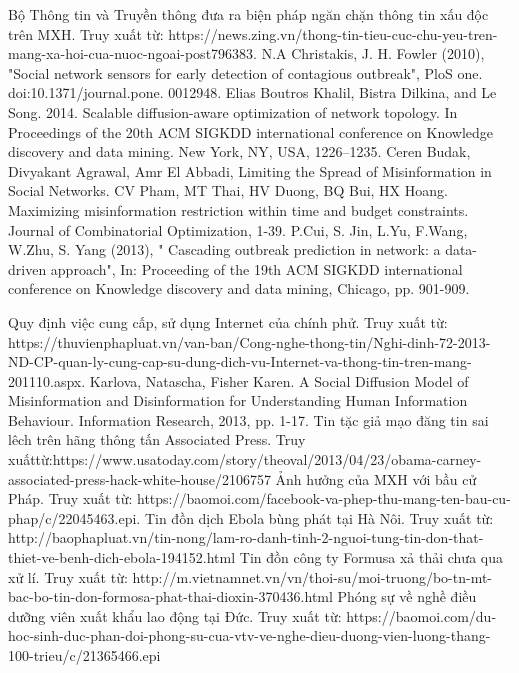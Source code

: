 
\begin{thebibliography}{4}
	 Bộ Thông tin và Truyền thông đưa ra biện pháp ngăn chặn thông tin xấu độc trên MXH. Truy xuất từ: https://news.zing.vn/thong-tin-tieu-cuc-chu-yeu-tren-mang-xa-hoi-cua-nuoc-ngoai-post796383.
	 N.A Christakis, J. H. Fowler (2010), "Social network sensors for early detection of contagious outbreak", PloS one. doi:10.1371/journal.pone. 0012948.
	 Elias Boutros Khalil, Bistra Dilkina, and Le Song. 2014. Scalable diffusion-aware optimization of network topology. In Proceedings of the 20th ACM SIGKDD international conference on Knowledge discovery and data mining. New York, NY, USA, 1226–1235.
	 Ceren Budak, Divyakant Agrawal, Amr El Abbadi, Limiting the Spread of Misinformation in Social Networks. 
	 CV Pham, MT Thai, HV Duong, BQ Bui, HX Hoang. Maximizing misinformation restriction within time and budget constraints. Journal of Combinatorial Optimization, 1-39.
	 P.Cui, S. Jin, L.Yu, F.Wang, W.Zhu, S. Yang (2013), " Cascading outbreak prediction in network: a data-driven approach", In: Proceeding of the 19th ACM SIGKDD international conference on Knowledge discovery and data mining, Chicago, pp. 901-909.

	 Quy định việc cung cấp, sử dụng Internet của chính phử. Truy xuất từ: https://thuvienphapluat.vn/van-ban/Cong-nghe-thong-tin/Nghi-dinh-72-2013-ND-CP-quan-ly-cung-cap-su-dung-dich-vu-Internet-va-thong-tin-tren-mang-201110.aspx. 
	 Karlova, Natascha, Fisher Karen. A Social Diffusion Model of Misinformation and Disinformation for Understanding Human Information Behaviour. Information Research, 2013, pp. 1-17.
	Tin tặc giả mạo đăng tin sai lêch trên hãng thông tấn Associated Press. Truy xuấttừ:https://www.usatoday.com/story/theoval/2013/04/23/obama-carney-associated-press-hack-white-house/2106757
	 Ảnh hưởng của MXH với bầu cử Pháp. Truy xuất từ:  https://baomoi.com/facebook-va-phep-thu-mang-ten-bau-cu-phap/c/22045463.epi.
	 Tin đồn dịch Ebola bùng phát tại Hà Nôi. Truy xuất từ: http://baophapluat.vn/tin-nong/lam-ro-danh-tinh-2-nguoi-tung-tin-don-that-thiet-ve-benh-dich-ebola-194152.html
	 Tin đồn công ty Formusa xả thải chưa qua xử lí. Truy xuất từ: http://m.vietnamnet.vn/vn/thoi-su/moi-truong/bo-tn-mt-bac-bo-tin-don-formosa-phat-thai-dioxin-370436.html
	 Phóng sự về nghề điều dưỡng viên xuất khẩu lao động tại Đức. Truy xuất từ: https://baomoi.com/du-hoc-sinh-duc-phan-doi-phong-su-cua-vtv-ve-nghe-dieu-duong-vien-luong-thang-100-trieu/c/21365466.epi
	

\end{thebibliography}
